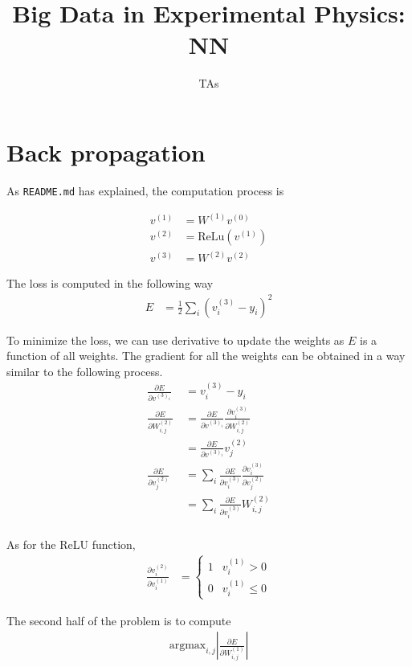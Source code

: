 \documentclass{article}
\title{\textbf{Big Data in Experimental Physics: NN}}
\author{TAs}
\begin{document}
\maketitle

\section{Back propagation}

As \texttt{README.md} has explained, the computation process is

\begin{align*}
  v^{(1)}&=W^{(1)}v^{(0)}\\
  v^{(2)}&=\text{ReLu}(v^{(1)})\\
  v^{(3)}&=W^{(2)}v^{(2)}
\end{align*}

The loss is computed in the following way
\begin{align*}
  E&=\frac{1}{2}\sum_{i}(v^{(3)}_i-y_i)^2
\end{align*}

\newcommand{\pfrac}[2]{\frac{\partial #1}{\partial #2}}

To minimize the loss, we can use derivative to update the weights as $E$ is a function of all weights. The gradient for all the weights can be obtained in a way similar to the following process.
\begin{align*}
  \pfrac{E}{v^{(3)_i}}&=v^{(3)}_i-y_i\\
  \pfrac{E}{W^{(2)}_{i,j}}\
  &=\pfrac{E}{v^{(3)_i}}\pfrac{v^{(3)}_i}{W^{(2)}_{i,j}}\\
  &=\pfrac{E}{v^{(3)_i}}v^{(2)}_j\\
  \pfrac{E}{v^{(2)}_j}
  &=\sum_i\pfrac{E}{v^{(3)}_i}\pfrac{v^{(3)}_i}{v^{(2)}_{j}}\\
  &=\sum_i\pfrac{E}{v^{(3)}_i}W^{(2)}_{i,j}\\
\end{align*}

As for the ReLU function,
\begin{align*}
  \pfrac{v^{(2)}_i}{v^{(1)}_i}
  &=\left\{
    \begin{array}{ll}
      1 & v^{(1)}_i>0\\
      0 & v^{(1)}_i\leq 0
    \end{array}
    \right.
\end{align*}

The second half of the problem is to compute
\begin{align*}
  \text{argmax}_{i,j}\left|\pfrac{E}{W^{(1)}_{i,j}}\right|
\end{align*}
\end{document}
